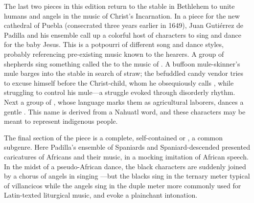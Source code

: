 The last two pieces in this edition return to the stable in Bethlehem to unite 
humans and angels in the music of Christ's Incarnation.
In a piece for the new cathedral of Puebla (consecrated three years earlier in 
1649), Juan Gutiérrez de Padilla and his ensemble call up a colorful host of
characters  to sing and dance for the baby
Jesus.%
    \Autocite[406--467]{Cashner:PhD}
This  is a potpourri of different song and dance styles, 
probably referencing pre-existing music known to the hearers.
A group of shepherds sing something called the  to the music 
of .
A buffoon mule-skinner's mule barges into the stable in search of straw; the 
befuddled candy vendor tries to excuse himself before the Christ-child, whom he 
obsequiously calls , while struggling to control his mule---a 
struggle evoked through disorderly rhythm.
Next a group of , whose language marks them as 
agricultural laborers, dances a gentle .
This name is derived from a Nahuatl word, and these characters may be meant to 
represent indigenous people.

The final section of the piece is a complete, self-contained  or 
, a common subgenre.
Here Padilla's ensemble of Spaniards and Spaniard-descended  
presented caricatures of Africans and their music, in a mocking imitation of 
African speech.
In the midst of a pseudo-African dance, the black characters are suddenly 
joined by a chorus of angels in singing ---but the blacks sing in 
the ternary meter typical of villancicos while the angels sing in the duple
meter more commonly used for Latin-texted liturgical music, and evoke a
plainchant intonation.

